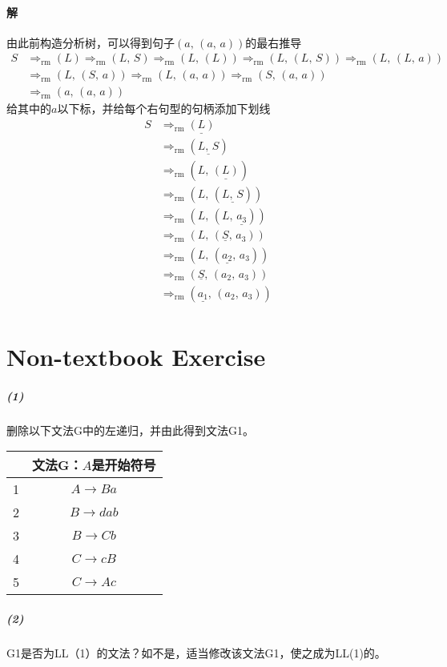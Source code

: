 \documentclass{article}
\begin{document}
\paragraph{解}
由此前构造分析树，可以得到句子$(a,\,(a,\,a))$的最右推导
\begin{align*}
    S &\Rightarrow_{\text{rm}} (L) \Rightarrow_{\text{rm}} (L,\,S) \Rightarrow_{\text{rm}} (L,\,(L)) \Rightarrow_{\text{rm}} (L,\,(L,\,S)) \Rightarrow_{\text{rm}} (L,\,(L,\,a)) \\
    &\Rightarrow_{\text{rm}} (L,\,(S,\,a))
    \Rightarrow_{\text{rm}} (L,\,(a,\,a)) \Rightarrow_{\text{rm}} (S,\,(a,\,a)) \\
    &\Rightarrow_{\text{rm}} (a,\,(a,\,a))
\end{align*}
给其中的$a$以下标，并给每个右句型的句柄添加下划线
\begin{align*}
    S &\Rightarrow_{\text{rm}} \underline{(L)} \\
    &\Rightarrow_{\text{rm}} (\underline{L,\,S}) \\
    &\Rightarrow_{\text{rm}} (L,\,\underline{(L)}) \\
    &\Rightarrow_{\text{rm}} (L,\,(\underline{L,\,S})) \\
    &\Rightarrow_{\text{rm}} (L,\,(L,\,\underline{a_3})) \\
    &\Rightarrow_{\text{rm}} (L,\,(\underline{S},\,a_3)) \\
    &\Rightarrow_{\text{rm}} (L,\,(\underline{a_2},\,a_3)) \\
    &\Rightarrow_{\text{rm}} (\underline{S},\,(a_2,\,a_3)) \\
    &\Rightarrow_{\text{rm}} (\underline{a_1},\,(a_2,\,a_3)) \\
\end{align*}

\section{Non-textbook Exercise}
\subparagraph{(1)}
删除以下文法G中的左递归，并由此得到文法G1。
\begin{table}[H]
    \centering
    \begin{tabular}{|c|c|}
        \hline
        & 文法G：$A$是开始符号 \\ \hline
        1 & $A \rightarrow Ba$ \\ \hline
        2 & $B \rightarrow dab$ \\ \hline
        3 & $B \rightarrow Cb$ \\ \hline
        4 & $C \rightarrow cB$ \\ \hline
        5 & $C \rightarrow Ac$ \\ \hline
    \end{tabular}
\end{table}
\subparagraph{(2)}
G1是否为LL（1）的文法？如不是，适当修改该文法G1，使之成为LL(1)的。
\end{document}
